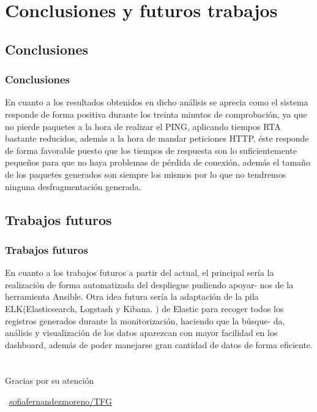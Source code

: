 \documentclass{beamer}
\theoremstyle{plain}
\theoremstyle{definition}
\theoremstyle{plain}
\theoremstyle{definition}
\theoremstyle{remark}
\theoremstyle{definition}
\begin{document}
\section{Conclusiones y futuros trabajos}
\subsection{Conclusiones}
\begin{frame}
	\frametitle{Conclusiones}
	En cuanto a los resultados obtenidos en dicho análisis se aprecia
	como el sistema responde de forma positiva durante los treinta minutos de
	comprobación, ya que no pierde paquetes a la hora de realizar el PING,
	aplicando tiempos RTA bastante reducidos, además a la hora de mandar
	peticiones HTTP, éste responde de forma favorable puesto que los tiempos
	de respuesta son lo suficientemente pequeños para que no haya problemas
	de pérdida de conexión, además el tamaño de los paquetes generados son
	siempre los mismos por lo que no tendremos ninguna desfragmentación generada.
	
\end{frame}
\subsection{Trabajos futuros}
\begin{frame}
	\frametitle{Trabajos futuros}
En cuanto a los trabajos futuros a partir del actual, el principal
sería la realización de forma automatizada del despliegue pudiendo apoyar-
nos de la herramienta Ansible. Otra idea futura sería la adaptación de la
pila ELK(Elasticsearch, Logstash y Kibana. ) de Elastic para recoger todos
los registros generados durante la monitorización, haciendo que la búsque-
da, análisis y visualización de los datos aparezcan con mayor facilidad en
los dashboard, además de poder manejarse gran cantidad de datos de forma
eficiente.	
\end{frame}
\section{}
\begin{frame}{}{}
	\Huge{\centerline{Gracias por su atención}}
	\centerline{\Huge{\raisebox{-.25\height}\faGithub}~\large{\href{https://github.com/sofiafernandezmoreno/TFG}{\alert{sofiafernandezmoreno/TFG}}}}

\end{frame}
\end{document}
